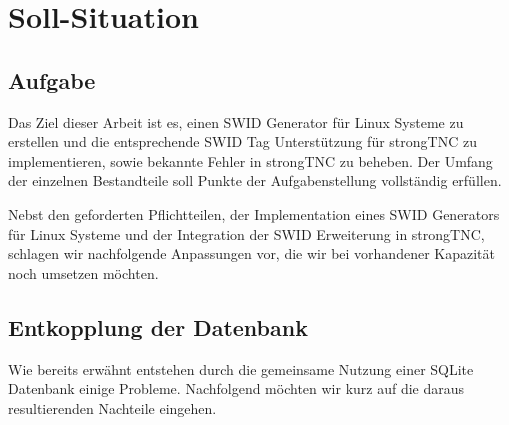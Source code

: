 \section{Soll-Situation}
\label{analyse:soll-situation}

\subsection{Aufgabe}
Das Ziel dieser Arbeit ist es, einen SWID Generator für Linux Systeme zu
erstellen und die entsprechende SWID Tag Unterstützung für strongTNC zu
implementieren, sowie bekannte Fehler in strongTNC zu beheben. Der Umfang der
einzelnen Bestandteile soll Punkte der Aufgabenstellung vollständig erfüllen.


Nebst den geforderten Pflichtteilen, der Implementation eines SWID Generators
für Linux Systeme und der Integration der SWID Erweiterung in strongTNC,
schlagen wir nachfolgende Anpassungen vor, die wir bei vorhandener Kapazität
noch umsetzen möchten.

\subsection{Entkopplung der Datenbank}
\label{analyse:architekturen}
Wie bereits erwähnt entstehen durch die gemeinsame Nutzung einer SQLite
Datenbank einige Probleme. Nachfolgend möchten wir kurz auf die daraus
resultierenden Nachteile eingehen.

